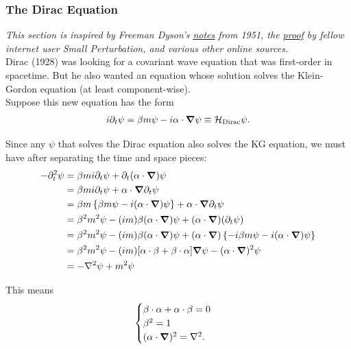\documentclass{book}
\theoremstyle{definition}
\newcommand{\p}{\partial}
\newcommand{\ham}{\mathcal{H}}
\newcommand{\lc}{\left\{}
\newcommand{\rc}{\right\}}
\begin{document}
\subsubsection{The Dirac Equation}

\textit{This section is inspired by Freeman Dyson's \href{https://arxiv.org/pdf/quant-ph/0608140.pdf}{\underline{notes}} from 1951, the \href{http://www.smallperturbation.com/physics-proof}{\underline{proof}} by fellow internet user Small Perturbation, and various other online sources. }\\


Dirac (1928) was looking for a covariant wave equation that was first-order in spacetime. But he also wanted an equation whose solution solves the Klein-Gordon equation (at least component-wise). \\

Suppose this new equation has the form
\begin{align}
i\p_t \psi = \beta m \psi - i {\alpha} \cdot \grad{\psi} \equiv \ham_{\text{Dirac}}\psi.
\end{align}

Since any $\psi$ that solves the Dirac equation also solves the KG equation, we must have after separating the time and space pieces:
\begin{align}
-\p_t^2 \psi &= \beta mi \p_t\psi  + \p_t (\alpha\cdot \grad)\psi\nonumber\\
&= \beta mi \p_t \psi + {\alpha}\cdot \grad{\p_t \psi} \nonumber\\
&= \beta m \lc \beta m \psi - i(\alpha \cdot \grad)\psi  \rc  + {\alpha}\cdot \grad{\p_t \psi}\nonumber\\
&= \beta^2 m^2 \psi  - (im)\beta (\alpha \cdot \grad)\psi + (\alpha \cdot \grad)(\p_t \psi) \nonumber\\
&= \beta^2 m^2 \psi  - (im)\beta (\alpha \cdot \grad)\psi + (\alpha \cdot \grad) \lc -i \beta m \psi - i(\alpha \cdot \grad)\psi  \rc \nonumber\\
&= \beta^2 m^2 \psi - (im)[\alpha \cdot\beta + \beta \cdot \alpha ]\grad{\psi} - (\alpha \cdot\grad)^2\psi \nonumber\\
&= -\laplacian{\psi} + m^2 \psi
\end{align}



This means
\begin{align}
\begin{cases}
\beta \cdot \alpha + \alpha \cdot\beta = 0\\
\beta^2 = 1\\
(\alpha \cdot \grad)^2 = \laplacian.
\end{cases}
\end{align}
\end{document}
